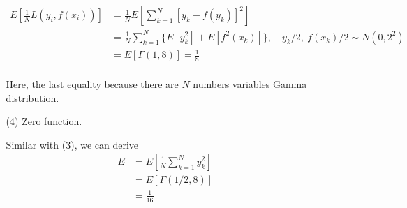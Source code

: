 \documentclass{article}
\begin{document}
\begin{enumerate}
\begin{enumerate}
        \begin{align*}
            E[\frac{1}{N}L(y_i, f(x_i))] 
            &= \frac 1 N E[\sum_{k = 1}^N [y_k - f(y_k)]^2]\\
            &= \frac 1 N \sum_{k = 1}^N\{E[y_k^2] + E[f^2(x_k)]\},\quad y_k/2,\ f(x_k)/2 \sim N(0, 2^2)\\
            &= E[\Gamma(1, 8)] = \frac 1 8\\
        \end{align*}

        Here, the last equality because there are $N$ numbers variables Gamma distribution.
        \item[(4)] Zero function.
        
        Similar with (3), we can derive 
        \begin{align*}
            E &= E[\frac 1 N \sum_{k = 1}^N y_k^2]\\
            &= E[\Gamma(1/2, 8)]\\
            &= \frac 1 {16}\\
        \end{align*}
    \end{enumerate}
\end{enumerate}
\end{document}
